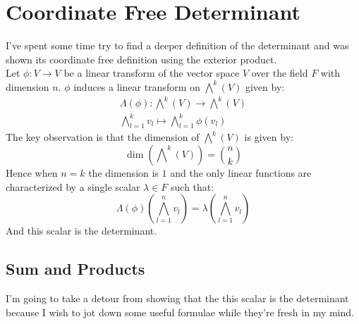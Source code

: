 
\section{Coordinate Free Determinant}
I've spent some time try to find a deeper definition of the determinant and was shown its coordinate free definition using the exterior product.
\\

Let $\phi:V\rightarrow V$ be a linear transform of the vector space $V$ over the field $F$ with dimension $n$.
$\phi$ induces a linear transform on $\bigwedge^k(V)$ given by:
\[\begin{aligned}
	\Lambda(\phi):\bigwedge\nolimits^k(V)\rightarrow\bigwedge\nolimits^k(V)\\
	\bigwedge^k_{l=1}v_l \mapsto \bigwedge^k_{l=1}\phi(v_l)
\end{aligned}\]
The key observation is that the dimension of $\bigwedge^k(V)$ is given by:
\[\dim\left(\bigwedge\nolimits^k(V)\right) = \binom{n}{k}\]
Hence when $n=k$ the dimension is $1$ and the only linear functions are characterized by a single scalar $\lambda \in F$ such that:
\[\Lambda(\phi)\left(\bigwedge^n_{l=1}v_l\right) = \lambda\left(\bigwedge^n_{l=1}v_l\right)\]
And this scalar is the determinant.

\subsection{Sum and Products}
I'm going to take a detour from showing that the this scalar is the determinant because I wish to jot down some useful formulae while they're fresh in my mind.
\\

